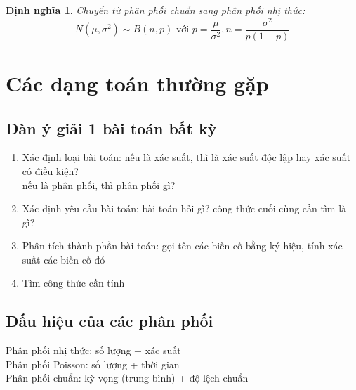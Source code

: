 \documentclass[12pt]{article}
\newtheorem{thm}{Định nghĩa}
\begin{document}
\begin{thm}
    Chuyển từ phân phối chuẩn sang phân phối nhị thức:
    \begin{equation}
        N(\mu, \sigma^2) \sim B(n, p) \text{ với } p = \frac{\mu}{\sigma^2}, n = \frac{\sigma^2}{p(1 - p)}
    \end{equation}

\end{thm}

\section {Các dạng toán thường gặp}
\subsection{Dàn ý giải 1 bài toán bất kỳ}
\begin{enumerate}
    \item Xác định loại bài toán: nếu là xác suất, thì là xác suất độc lập hay xác suất có điều kiện? \\
    nếu là phân phối, thì phân phối gì?
    \item Xác định yêu cầu bài toán: bài toán hỏi gì? công thức cuối cùng cần tìm là gì?
    \item Phân tích thành phần bài toán:
    gọi tên các biến cố bằng ký hiệu, tính xác suất các biến cố đó
    \item Tìm công thức cần tính
\end{enumerate}

\subsection{Dấu hiệu của các phân phối}
Phân phối nhị thức: số lượng + xác suất \\
Phân phối Poisson: số lượng + thời gian \\
Phân phối chuẩn: kỳ vọng (trung bình) + độ lệch chuẩn \\
\end{document}

